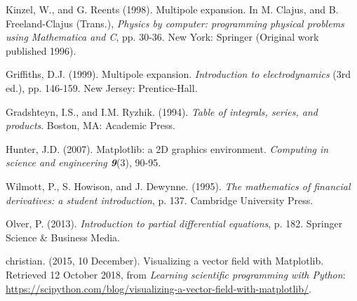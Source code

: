 \documentclass[10pt,a4paper,twoside]{article}
\begin{document}

\begin{thebibliography}{1}
\label{sec:Ref}

Kinzel, W., and G. Reents (1998). Multipole expansion. In M. Clajus, and B. Freeland-Clajus (Trans.), \textit{Physics by computer: programming physical problems using Mathematica and C}, pp. 30-36. New York: Springer (Original work published 1996).

Griffiths, D.J. (1999). Multipole expansion. \textit{Introduction to electrodynamics} (3rd ed.), pp. 146-159. New Jersey: Prentice-Hall.

Gradshteyn, I.S., and I.M. Ryzhik. (1994). \textit{Table of integrals, series, and products}. Boston, MA: Academic Press.

Hunter, J.D. (2007). Matplotlib: a 2D graphics environment. \textit{Computing in science and engineering \textbf{9}}(3), 90-95.

Wilmott, P., S. Howison, and J. Dewynne. (1995). \textit{The mathematics of financial derivatives: a student introduction}, p. 137. Cambridge University Press.

Olver, P. (2013). \textit{Introduction to partial differential equations}, p. 182. Springer Science \& Business Media.

christian. (2015, 10 December). Visualizing a vector field with Matplotlib. Retrieved 12 October 2018, from \textit{Learning scientific programming with Python}: \url{https://scipython.com/blog/visualizing-a-vector-field-with-matplotlib/}.

\end{thebibliography}
\end{document}
